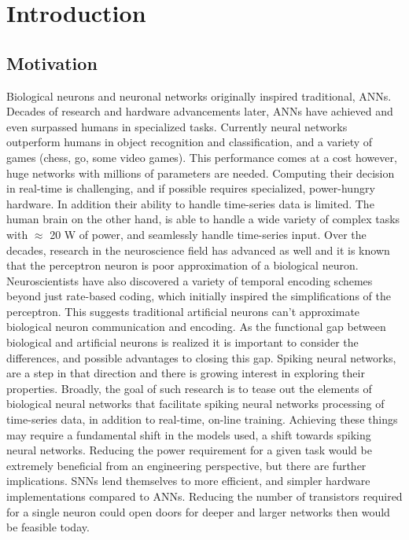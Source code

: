 %
%
%
%
%


\chapter{Introduction}\label{section:introduction}
\section{Motivation}
Biological neurons and neuronal networks originally inspired traditional,
ANNs. Decades of research and hardware advancements later, ANNs have achieved
and even surpassed humans in specialized tasks. Currently neural networks
outperform humans in object recognition and classification, and a variety of
games (chess, go, some video games). This performance comes at a cost however,
huge networks with millions of parameters are needed. Computing their decision
in real-time is challenging, and if possible requires specialized, power-hungry
hardware. In addition their ability to handle time-series data is limited. The
human brain on the other hand, is able to handle a wide variety of complex tasks
with $\approx$ 20 W of power, and seamlessly handle time-series input. Over the
decades, research in the neuroscience field has advanced as well and it is known
that the perceptron neuron is poor approximation of a biological
neuron. Neuroscientists have also discovered a variety of temporal encoding
schemes beyond just rate-based coding, which initially inspired the
simplifications of the perceptron. This suggests traditional artificial neurons
can't approximate biological neuron communication and encoding. As the
functional gap between biological and artificial neurons is realized it is
important to consider the differences, and possible advantages to closing this
gap. Spiking neural networks, are a step in that direction and there is growing
interest in exploring their properties. Broadly, the goal of such research is to
tease out the elements of biological neural networks that facilitate spiking
neural networks processing of time-series data, in addition to real-time,
on-line training. Achieving these things may require a fundamental shift in the
models used, a shift towards spiking neural networks. Reducing the power
requirement for a given task would be extremely beneficial from an engineering
perspective, but there are further implications. SNNs lend themselves to more
efficient, and simpler hardware implementations compared to ANNs. Reducing the
number of transistors required for a single neuron could open doors for deeper
and larger networks then would be feasible today.
    
